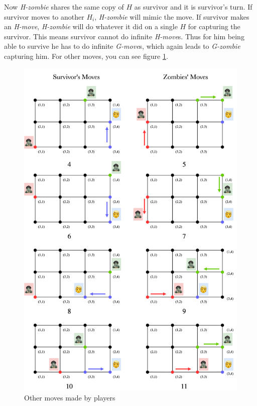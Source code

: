 \documentclass[1p]{elsarticle}
\begin{document}
Now {\it H-zombie} shares the same copy of $H$ as survivor and it is survivor's turn. If survivor moves to another
$H_i$, {\it H-zombie} will mimic the move. If survivor makes an {\it H-move}, {\it H-zombie} will do whatever it did on
a single $H$ for capturing the survivor. This means survivor cannot do infinite {\it H-move}s. Thus for him being able
to survive he has to do infinite {\it G-move}s, which again leads to {\it G-zombie} capturing him. For other moves, you
can see figure \ref{fig:p6}.

\begin{figure}[h!]
	\centering
	\includegraphics[width=1\linewidth]{fig/p34m6.png}
	\caption{Other moves made by players}
	\label{fig:p6}
\end{figure}

	
\end{document}
